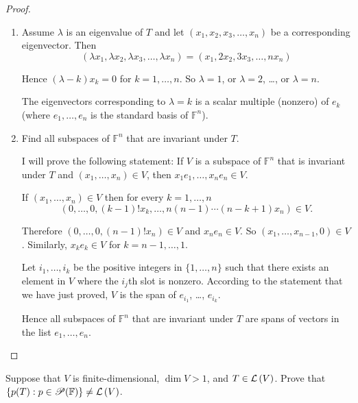 \begin{proof}
    \begin{enumerate}[label={(\alph*)}]
        \item Assume $\lambda$ is an eigenvalue of $T$ and let $(x_{1}, x_{2}, x_{3}, \ldots, x_{n})$ be a corresponding eigenvector. Then
              \[
                  (\lambda x_{1}, \lambda x_{2}, \lambda x_{3}, \ldots, \lambda x_{n}) = (x_{1}, 2x_{2}, 3x_{3}, \ldots, nx_{n})
              \]

              Hence $(\lambda - k)x_{k} = 0$ for $k = 1,\ldots, n$. So $\lambda = 1$, or $\lambda = 2$, \ldots, or $\lambda = n$.

              The eigenvectors corresponding to $\lambda = k$ is a scalar multiple (nonzero) of $e_{k}$ (where $e_{1}, \ldots, e_{n}$ is the standard basis of $\mathbb{F}^{n}$).
        \item Find all subspaces of $\mathbb{F}^{n}$ that are invariant under $T$.

              I will prove the following statement: If $V$ is a subspace of $\mathbb{F}^{n}$ that is invariant under $T$ and $(x_{1}, \ldots, x_{n})\in V$, then $x_{1}e_{1}, \ldots, x_{n}e_{n}\in V$.

              If $(x_{1}, \ldots, x_{n})\in V$ then for every $k = 1, \ldots, n$
              \[
                  (0, \ldots, 0, (k-1)!x_{k}, \ldots, n(n-1)\cdots (n - k + 1)x_{n})\in V.
              \]

              Therefore $(0, \ldots, 0, (n-1)!x_{n})\in V$ and $x_{n}e_{n}\in V$. So $(x_{1}, \ldots, x_{n-1}, 0)\in V$. Similarly, $x_{k}e_{k}\in V$ for $k = n-1, \ldots, 1$.

              Let $i_{1}, \ldots, i_{k}$ be the positive integers in $\{ 1, \ldots, n \}$ such that there exists an element in $V$ where the $i_{j}$th slot is nonzero. According to the statement that we have just proved, $V$ is the span of $e_{i_{1}}$, \ldots, $e_{i_{k}}$.

              Hence all subspaces of $\mathbb{F}^{n}$ that are invariant under $T$ are spans of vectors in the list $e_{1}, \ldots, e_{n}$.
    \end{enumerate}
\end{proof}
\newpage

\begin{exercise}
    Suppose that $V$ is finite-dimensional, $\dim V > 1$, and $T\in\mathcal{L}\left({V}\right)$. Prove that $\{ p(T): p\in\mathscr{P}(\mathbb{F}) \}\ne \mathcal{L}\left({V}\right)$.
\end{exercise}

